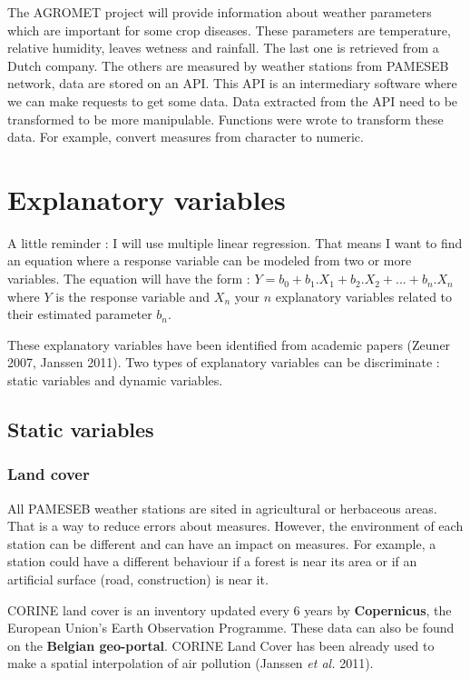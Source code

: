 \documentclass[12pt,twoside]{reedthesis}
\theoremstyle{definition}
\theoremstyle{definition}
\theoremstyle{definition}
\theoremstyle{remark}
\begin{document}
The AGROMET project will provide information about weather parameters
which are important for some crop diseases. These parameters are
temperature, relative humidity, leaves wetness and rainfall. The last
one is retrieved from a Dutch company. The others are measured by
weather stations from PAMESEB network, data are stored on an API. This
API is an intermediary software where we can make requests to get some
data. Data extracted from the API need to be transformed to be more
manipulable. Functions were wrote to transform these data. For example,
convert measures from character to numeric.

\section{Explanatory variables}\label{explanatory-variables}

A little reminder : I will use multiple linear regression. That means I
want to find an equation where a response variable can be modeled from
two or more variables. The equation will have the form :
\(Y = b_0 + b_1.X_1 + b_2.X_2 + ... + b_n.X_n\) where \(Y\) is the
response variable and \(X_n\) your \(n\) explanatory variables related
to their estimated parameter \(b_n\).

These explanatory variables have been identified from academic papers
(Zeuner 2007, Janssen 2011). Two types of explanatory variables can be
discriminate : static variables and dynamic variables.

\subsection{Static variables}\label{static-variables}

\subsubsection{Land cover}\label{land-cover}

All PAMESEB weather stations are sited in agricultural or herbaceous
areas. That is a way to reduce errors about measures. However, the
environment of each station can be different and can have an impact on
measures. For example, a station could have a different behaviour if a
forest is near its area or if an artificial surface (road, construction)
is near it.

CORINE land cover is an inventory updated every 6 years by
\textbf{Copernicus}, the European Union's Earth Observation Programme.
These data can also be found on the \textbf{Belgian geo-portal}. CORINE
Land Cover has been already used to make a spatial interpolation of air
pollution (Janssen \emph{et al.} 2011).
\end{document}
